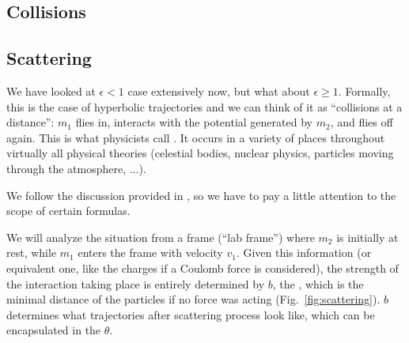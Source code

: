 \documentclass[../class_mech_main.tex]{subfiles}
\begin{document}
		\subsection{Collisions}



		\subsection{Scattering}
We have looked at $\epsilon < 1$ case extensively now, but what about $\epsilon \geq 1$. Formally, this is the case of hyperbolic trajectories and we can think of it as \enquote{collisions at a distance}: $m_1$ flies in, interacts with the potential generated by $m_2$, and flies off again. This is what physicists call . It occurs in a variety of places throughout virtually all physical theories (celestial bodies, nuclear physics, particles moving through the atmosphere, ...). %



We follow the discussion provided in \cite{Thornton_2003}, so we have to pay a little attention to the scope of certain formulas. 


We will analyze the situation from a frame (\enquote{lab frame}) where $m_2$ is initially at rest, while $m_1$ enters the frame with velocity $v_1$. Given this information (or equivalent one, like the charges if a Coulomb force is considered), the strength of the interaction taking place is entirely determined by $b$, the , which is the minimal distance of the particles if no force was acting (Fig.~\ref{fig:scattering}). $b$ determines what trajectories after scattering process look like, which can be encapsulated in the  $\theta$.
\end{document}
